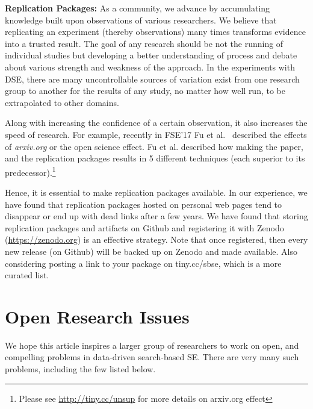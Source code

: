 \documentclass[sigconf,anonymous,review]{acmart}
\begin{document}
  \noindent\textbf{Replication Packages: } As a community, we advance by accumulating knowledge built upon observations of various researchers. We believe that replicating an experiment (thereby observations) many times transforms evidence into a trusted result. The goal of any research should be not the running
of individual studies but developing a better understanding
of process and debate about various strength and weakness of the approach.
In the experiments with DSE, there are many uncontrollable sources of variation exist from
one research group to another for the results of any study, no
matter how well run, to be extrapolated to other domains. 

Along with increasing the confidence of a certain observation, it also increases the speed of research. For example, recently in FSE'17 Fu et al.~\cite{fu2017revisiting} described the effects of \textit{arxiv.org} or the open science effect. Fu et al. described how making the paper, and the replication packages results in 5 different techniques (each superior to its predecessor).\footnote{Please see \url{http://tiny.cc/unsup}  for more details on arxiv.org effect} 

Hence, it is essential to make replication packages available. 
In our experience, we have found that replication packages hosted on personal web pages tend to disappear or end up with dead links after a few years.
We have found that storing replication packages and artifacts on Github and registering it with Zenodo (\href{https://zenodo.org}{https://zenodo.org}) is an effective strategy. 
Note that once registered, then every new release (on Github) will be backed up on Zenodo and made available. Also considering posting a link to your package on tiny.cc/sbse, which is a more curated list. 
    
     


\section{Open Research Issues}
We hope this article inspires a larger group of researchers to work
on open, and compelling problems
in data-driven search-based SE. There are very many such problems, including the few listed below.
\end{document}
